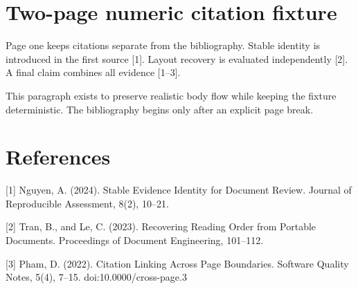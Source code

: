 \documentclass[11pt]{article}
\begin{document}
\section*{Two-page numeric citation fixture}

Page one keeps citations separate from the bibliography. Stable identity is introduced in the first source [1].
Layout recovery is evaluated independently [2]. A final claim combines all evidence [1--3].

This paragraph exists to preserve realistic body flow while keeping the fixture deterministic. The bibliography begins only after an explicit page break.

\newpage
\section*{References}

[1] Nguyen, A. (2024). Stable Evidence Identity for Document Review. Journal of Reproducible Assessment, 8(2), 10--21.

[2] Tran, B., and Le, C. (2023). Recovering Reading Order from Portable Documents. Proceedings of Document Engineering, 101--112.

[3] Pham, D. (2022). Citation Linking Across Page Boundaries. Software Quality Notes, 5(4), 7--15. doi:10.0000/cross-page.3
\end{document}
